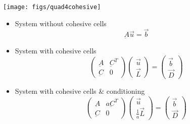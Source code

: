 \documentclass[pdftex,cig,slideColor]{pp4slides}
\begin{document}
 
  \vfill
  \begin{center}
    \texttt{[image: figs/quad4cohesive]}
  \end{center}


  \begin{itemize}
  \item System without cohesive cells
    \begin{equation}
      \underbar{A} \vec{u} = \vec{b} \nonumber
    \end{equation}
  \item System with cohesive cells
    \begin{equation}
      \left( \begin{array}{cc}
          \underbar{A} & \underbar{C}^T\\
          \underbar{C} & 0
        \end{array} \right)
      \left( \begin{array}{c}
          \vec{u}\\
          \vec{L}
        \end{array}\right)
      =
      \left( \begin{array}{c}
          \vec{b}\\
          \vec{D}
        \end{array} \right)
      \nonumber
    \end{equation}
  \item System with cohesive cells \& conditioning
    \begin{equation}
      \left( \begin{array}{cc}
          \underbar{A} & a \underbar{C}^T\\
          \underbar{C} & 0
        \end{array} \right)
      \left( \begin{array}{c}
          \vec{u}\\
          \frac{1}{a} \vec{L}
        \end{array}\right)
      =
      \left( \begin{array}{c}
          \vec{b}\\
          \vec{D}
        \end{array} \right)
      \nonumber
    \end{equation}
  \end{itemize}
  
\end{document}
